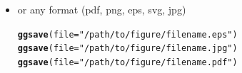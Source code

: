 \documentclass{beamer}\usepackage[]{graphicx}\usepackage[]{color}
\makeatletter
\newcommand{\hlstr}[1]{\textcolor[rgb]{0.192,0.494,0.8}{#1}}%
\newcommand{\hlstd}[1]{\textcolor[rgb]{0.345,0.345,0.345}{#1}}%
\newcommand{\hlkwc}[1]{\textcolor[rgb]{0.333,0.667,0.333}{#1}}%
\newcommand{\hlkwd}[1]{\textcolor[rgb]{0.737,0.353,0.396}{\textbf{#1}}}%
\newenvironment{kframe}{%
 \def\at@end@of@kframe{}%
 \ifinner\ifhmode%
  \def\at@end@of@kframe{\end{minipage}}%
  \begin{minipage}{\columnwidth}%
 \fi\fi%
 \def\FrameCommand##1{\hskip\@totalleftmargin \hskip-\fboxsep
 \colorbox{shadecolor}{##1}\hskip-\fboxsep
     \hskip-\linewidth \hskip-\@totalleftmargin \hskip\columnwidth}%
 \MakeFramed {\advance\hsize-\width
   \@totalleftmargin\z@ \linewidth\hsize
   \@setminipage}}%
 {\par\unskip\endMakeFramed%
 \at@end@of@kframe}
\newenvironment{knitrout}{}{} %
\makeatother
\begin{document}
\begin{frame}[fragile]
\begin{itemize}
\item or any format (pdf, png, eps, svg, jpg)
\begin{knitrout}\footnotesize
{}\color{fgcolor}\begin{kframe}
\begin{alltt}
\hlkwd{ggsave}\hlstd{(}\hlkwc{file} \hlstd{=} \hlstr{"/path/to/figure/filename.eps"}\hlstd{)}
\hlkwd{ggsave}\hlstd{(}\hlkwc{file} \hlstd{=} \hlstr{"/path/to/figure/filename.jpg"}\hlstd{)}
\hlkwd{ggsave}\hlstd{(}\hlkwc{file} \hlstd{=} \hlstr{"/path/to/figure/filename.pdf"}\hlstd{)}
\end{alltt}
\end{kframe}
\end{knitrout}

\end{itemize}
\end{frame}

\end{document}
